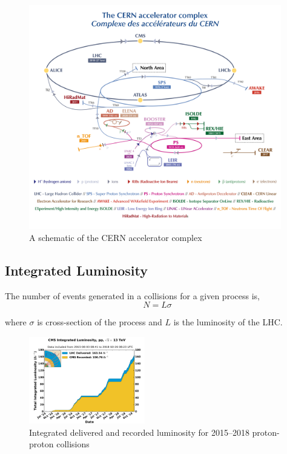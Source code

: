 \begin{figure}[!ht]
  \centering
  \includegraphics[width=0.98\textwidth]{figures/lhc-scheme.png}
  \caption[A schematic of the CERN accelerator complex]%
  {A schematic of the CERN accelerator complex~\cite{image-lhc-scheme}}%
  \label{fig:lhc}
\end{figure}

\subsection{
  Integrated Luminosity
}\label{ch_cms:cms-lumi}

The number of events generated in a collisions for a given process is,
%
\begin{equation}
  N = L \sigma
\end{equation}

where \(\sigma \) is cross-section of the process
and \(L\) is the luminosity of the \gls{LHC}.

\begin{figure}[!ht]
  \centering
  \includegraphics[width=0.45\textwidth]{figures/int_lumi_pp_run2.pdf}
  \caption[Integrated delivered and recorded luminosity
    for 2015--2018 proton-proton collisions]%
  {Integrated delivered and recorded luminosity
    for  2015--2018 proton-proton collisions~\cite{plot-cms-lumi}}%
  \label{fig:int-lumi}
\end{figure}

